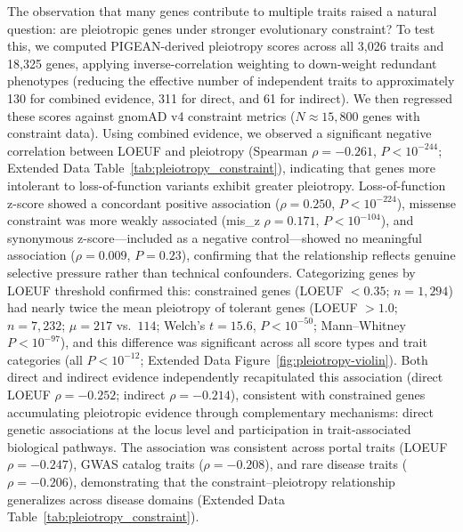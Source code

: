 The observation that many genes contribute to multiple traits raised a natural question: are pleiotropic genes under stronger evolutionary constraint? To test this, we computed PIGEAN-derived pleiotropy scores across all 3,026 traits and 18,325 genes, applying inverse-correlation weighting to down-weight redundant phenotypes (reducing the effective number of independent traits to approximately 130 for combined evidence, 311 for direct, and 61 for indirect). We then regressed these scores against gnomAD v4 constraint metrics ($N \approx 15{,}800$ genes with constraint data). Using combined evidence, we observed a significant negative correlation between LOEUF and pleiotropy (Spearman $\rho = -0.261$, $P < 10^{-244}$; Extended Data Table~\ref{tab:pleiotropy_constraint}), indicating that genes more intolerant to loss-of-function variants exhibit greater pleiotropy. Loss-of-function z-score showed a concordant positive association ($\rho = 0.250$, $P < 10^{-224}$), missense constraint was more weakly associated (mis\_z $\rho = 0.171$, $P < 10^{-104}$), and synonymous z-score---included as a negative control---showed no meaningful association ($\rho = 0.009$, $P = 0.23$), confirming that the relationship reflects genuine selective pressure rather than technical confounders. Categorizing genes by LOEUF threshold confirmed this: constrained genes (LOEUF $< 0.35$; $n = 1{,}294$) had nearly twice the mean pleiotropy of tolerant genes (LOEUF $> 1.0$; $n = 7{,}232$; $\mu = 217$ vs.\ $114$; Welch's $t = 15.6$, $P < 10^{-50}$; Mann--Whitney $P < 10^{-97}$), and this difference was significant across all score types and trait categories (all $P < 10^{-12}$; Extended Data Figure~\ref{fig:pleiotropy-violin}). Both direct and indirect evidence independently recapitulated this association (direct LOEUF $\rho = -0.252$; indirect $\rho = -0.214$), consistent with constrained genes accumulating pleiotropic evidence through complementary mechanisms: direct genetic associations at the locus level and participation in trait-associated biological pathways. The association was consistent across portal traits (LOEUF $\rho = -0.247$), GWAS catalog traits ($\rho = -0.208$), and rare disease traits ($\rho = -0.206$), demonstrating that the constraint--pleiotropy relationship generalizes across disease domains (Extended Data Table~\ref{tab:pleiotropy_constraint}).

